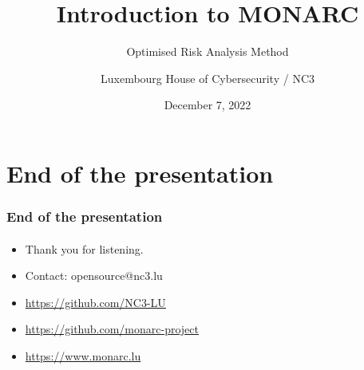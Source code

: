 \documentclass[]{beamer}
\title[Introduction to MONARC]{Introduction to MONARC}
\subtitle{Optimised Risk Analysis Method}
\author[NC3]{Luxembourg House of Cybersecurity / NC3}
\institute[]{\href{https://www.nc3.lu}{National Cybersecurity Competence Centre of Luxembourg}}
\date{December 7, 2022}
\begin{document}
\begin{frame}
  \titlepage
\end{frame}





% 
% 



%
%
\section*{End of the presentation}
\begin{frame}
  \frametitle{End of the presentation}
  \framesubtitle{}
  \begin{center}
    \begin{itemize}
      \item Thank you for listening.
      \item Contact: opensource@nc3.lu
      \item \url{https://github.com/NC3-LU}
      \item \url{https://github.com/monarc-project}
      \item \url{https://www.monarc.lu}
    \end{itemize}
  \end{center}
\end{frame}
\end{document}
